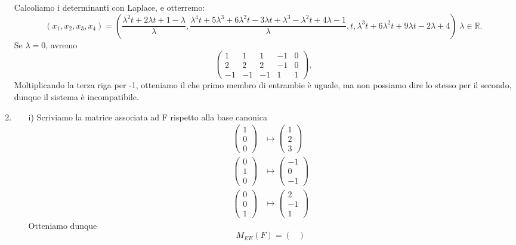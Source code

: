 \documentclass{article}
\theoremstyle{plain}
\theoremstyle{definition}
\theoremstyle{remark}
\begin{document}
\begin{enumerate}
\begin{center}
    \end{center}
    Calcoliamo i determinanti con Laplace, e otterremo:
    \[(x_1,x_2,x_3,x_4)=\left(\dfrac{\lambda^2t+2\lambda t+1-\lambda}{\lambda},\dfrac{\lambda^4t+5\lambda^3+6\lambda^2t-3\lambda t+\lambda^3-\lambda^2t+4\lambda-1}{\lambda},t,\lambda^3t+6\lambda^2t+9\lambda t-2\lambda+4\right)\;\lambda\in\mathbb{R}.\]
    Se $\lambda=0$, avremo
    \[\begin{pmatrix}
        1&1&1&-1&0\\
        2&2&2&-1&0\\
        -1&-1&-1&1&1
    \end{pmatrix},\]
    Moltiplicando la terza riga per -1, otteniamo il che primo membro di entrambie è uguale, ma non possiamo dire lo stesso per il secondo, dunque il sistema è incompatibile.
    \item 
    \begin{enumerate}
        \item[i)] Scriviamo la matrice associata ad F rispetto alla base canonica 
        \begin{align*}
            \begin{pmatrix}1\\0\\0\end{pmatrix} &\mapsto \begin{pmatrix} 1\\2\\3 \end{pmatrix}\\
            \begin{pmatrix}0\\1\\0\end{pmatrix} &\mapsto \begin{pmatrix} -1\\0\\-1 \end{pmatrix}\\
            \begin{pmatrix}0\\0\\1\end{pmatrix} &\mapsto \begin{pmatrix} 2\\-1\\1 \end{pmatrix}
        \end{align*}
        Otteniamo dunque 
        \[M_{EE}(F)=\begin{pmatrix}

\end{pmatrix}\]
\end{enumerate}
\end{enumerate}
\end{document}
